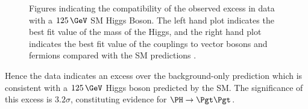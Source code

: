 \begin{figure}[h!]
\caption[Figures indicating the compatibility of the observed excess in data
with a $125\,\GeV$ SM Higgs Boson.]{Figures indicating the compatibility of the observed excess in data
with a $125\,\GeV$ \ac{SM} Higgs Boson. The left hand plot indicates the best fit
value of the mass of the Higgs, and the right hand plot indicates the best fit
value of the couplings to vector bosons and fermions compared with the \ac{SM}
predictions \cite{HIG-13-004}.}
\label{fig:results-properties}
\end{figure}

Hence the data indicates an excess over the background-only prediction which is
consistent with a $125\,\GeV$ Higgs boson predicted by the \ac{SM}. The
significance of this excess is $3.2\sigma$, constituting evidence for
$\HToTauTau$.


